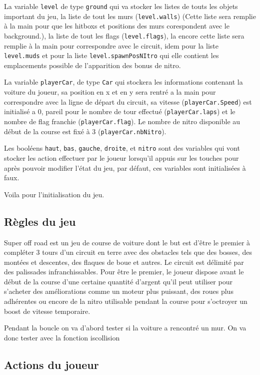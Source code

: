 \documentclass[11pt]{report}
\renewcommand{\tt}[1]{\texttt{#1}}
\begin{document}
La variable \tt{level} de type \tt{ground} qui va stocker les listes de touts les objets important du jeu, la liste de tout les murs (\tt{level.walls}) (Cette liste sera remplie à la main pour que les hitboxs et positions des murs corespondent avec le background.), la liste de tout les flags (\tt{level.flags}), la encore cette liste sera remplie à la main pour correspondre avec le circuit, idem pour la liste \tt{level.muds} et pour la liste \tt{level.spawnPosNItro} qui elle contient les emplacements possible de l'apparition des bonus de nitro.

La variable \tt{playerCar}, de type \tt{Car} qui stockera les informations contenant la voiture du joueur, sa position en x et en y sera rentré a la main pour correspondre avec la ligne de départ du circuit, sa vitesse (\tt{playerCar.Speed}) est initialisé a 0, pareil pour le nombre de tour effectué (\tt{playerCar.laps}) et le nombre de flag franchie (\tt{playerCar.flag}).
Le nombre de nitro disponible au début de la course est fixé à 3 (\tt{playerCar.nbNitro}).

Les booléens \tt{haut}, \tt{bas}, \tt{gauche}, \tt{droite}, et \tt{nitro} sont des variables qui vont stocker les action effectuer par le joueur lorsqu'il appuis sur les touches pour après pouvoir modifier l'état du jeu, par défaut, ces variables sont initialisées à faux.

Voila pour l'initialisation du jeu.

\subsection{Règles du jeu}

Super off road est un jeu de course de voiture dont le but est d'être le premier à compléter 3 tours d'un circuit en terre avec des obstacles tels que des bosses, des montées et descentes, des flaques de boue et autres. Le circuit est délimité par des palissades infranchissables. Pour être le premier, le joueur dispose avant le début de la course d'une certaine quantité d'argent qu'il peut utiliser pour s'acheter des améliorations comme un moteur plus puissant, des roues plus adhérentes ou encore de la nitro utilisable pendant la course pour s'octroyer un boost de vitesse temporaire.



Pendant la boucle on va d'abord tester si la voiture a rencontré un mur. On va donc tester avec la fonction iscollision 
\subsection{Actions du joueur}
\end{document}
